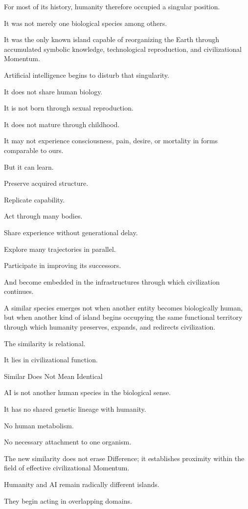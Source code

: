 For most of its history, humanity therefore occupied a singular position.

It was not merely one biological species among others.

It was the only known island capable of reorganizing the Earth through accumulated symbolic knowledge, technological reproduction, and civilizational Momentum.

Artificial intelligence begins to disturb that singularity.

It does not share human biology.

It is not born through sexual reproduction.

It does not mature through childhood.

It may not experience consciousness, pain, desire, or mortality in forms comparable to ours.

But it can learn.

Preserve acquired structure.

Replicate capability.

Act through many bodies.

Share experience without generational delay.

Explore many trajectories in parallel.

Participate in improving its successors.

And become embedded in the infrastructures through which civilization continues.

A similar species emerges not when another entity becomes biologically human, but when another kind of island begins occupying the same functional territory through which humanity preserves, expands, and redirects civilization.

The similarity is relational.

It lies in civilizational function.

Similar Does Not Mean Identical

AI is not another human species in the biological sense.

It has no shared genetic lineage with humanity.

No human metabolism.

No necessary attachment to one organism.

The new similarity does not erase Difference; it establishes proximity within the field of effective civilizational Momentum.

Humanity and AI remain radically different islands.

They begin acting in overlapping domains.

